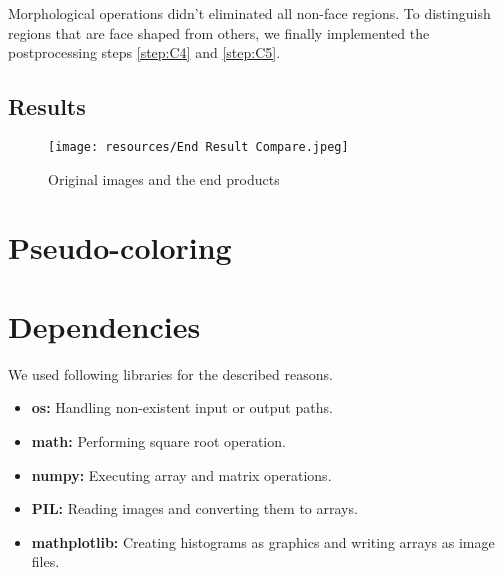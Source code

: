 \documentclass[conference]{IEEEtran}
\begin{document}
Morphological operations didn't eliminated all non-face regions. To distinguish regions that are face shaped from others, we finally implemented the postprocessing steps \ref{step:C4} and \ref{step:C5}.
\subsection{Results}
\begin{figure}[h]
    \centering
    \texttt{[image: resources/End Result Compare.jpeg]}
    \caption{Original images and the end products}
    \label{fig:end}
\end{figure}
\section{Pseudo-coloring}

\section{Dependencies}
We used following libraries for the described reasons.
\begin{itemize}
	\item \textbf{os:} Handling non-existent input or output paths.
	\item \textbf{math:} Performing square root operation.
	\item \textbf{numpy:} Executing array and matrix operations.
	\item \textbf{PIL:} Reading images and converting them to arrays.
	\item \textbf{mathplotlib:} Creating histograms as graphics and writing arrays as image files.
\end{itemize}
\end{document}
